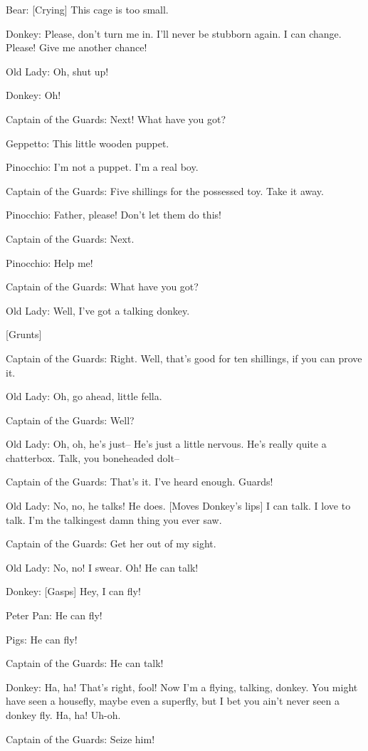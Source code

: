 \documentclass{article}
\begin{document}
Bear:
[Crying] This cage is too small.

Donkey:
Please, don't turn me in. I'll never be stubborn again. I can change. Please! Give me another chance!

Old Lady:
Oh, shut up!

Donkey:
Oh!

Captain of the Guards: Next! What have you got?

Geppetto:
This little wooden puppet.

Pinocchio:
I'm not a puppet. I'm a real boy.

Captain of the Guards: Five shillings for the possessed toy. Take it away.

Pinocchio:
Father, please! Don't let them do this!

Captain of the Guards: Next.

Pinocchio:
Help me!

Captain of the Guards: What have you got?

Old Lady:
Well, I've got a talking donkey.

[Grunts]

Captain of the Guards: Right. Well, that's good for ten shillings, if you can prove it.

Old Lady:
Oh, go ahead, little fella.

Captain of the Guards: Well?

Old Lady:
Oh, oh, he's just-- He's just a little nervous. He's really quite a chatterbox. Talk, you boneheaded dolt--

Captain of the Guards: That's it. I've heard enough. Guards!

Old Lady:
No, no, he talks! He does. [Moves Donkey’s lips] I can talk. I love to talk. I'm the talkingest damn thing you ever saw.

Captain of the Guards: Get her out of my sight.

Old Lady:
No, no! I swear. Oh! He can talk!

Donkey:
[Gasps] Hey, I can fly!

Peter Pan:
He can fly!

Pigs:
He can fly!

Captain of the Guards: He can talk!

Donkey:
Ha, ha! That's right, fool! Now I'm a flying, talking, donkey. You might have seen a housefly, maybe even a superfly, but I bet you ain't never seen a donkey fly. Ha, ha! Uh-oh.

Captain of the Guards: Seize him!
\end{document}
